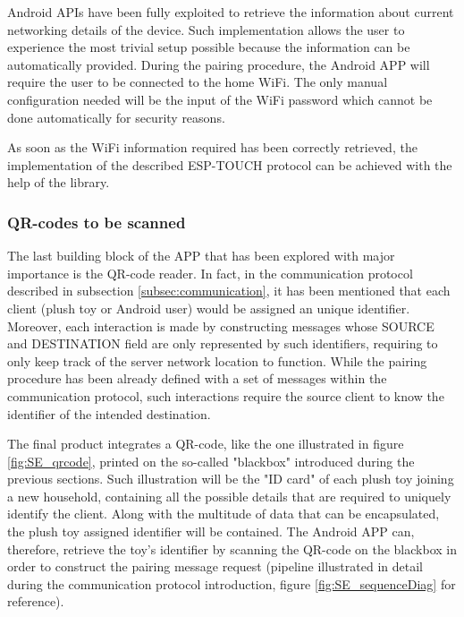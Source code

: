 Android APIs have been fully exploited to retrieve the information about current networking details of the device. Such implementation allows the user to experience the most trivial setup possible because the information can be automatically provided. During the pairing procedure, the Android APP will require the user to be connected to the home WiFi. The only manual configuration needed will be the input of the WiFi password which cannot be done automatically for security reasons.

\medskip
As soon as the WiFi information required has been correctly retrieved, the implementation of the described ESP-TOUCH protocol can be achieved with the help of the library.

\subsubsection{QR-codes to be scanned}
\label{subsubsec:android-barcode} 

The last building block of the APP that has been explored with major importance is the QR-code reader. In fact, in the communication protocol described in subsection \ref{subsec:communication}, it has been mentioned that each client (plush toy or Android user) would be assigned an unique identifier. Moreover, each interaction is made by constructing messages whose SOURCE and DESTINATION field are only represented by such identifiers, requiring to only keep track of the server network location to function. While the pairing procedure has been already defined with a set of messages within the communication protocol, such interactions require the source client to know the identifier of the intended destination.

\medskip
The final product integrates a QR-code, like the one illustrated in figure \ref{fig:SE_qrcode}, printed on the so-called "blackbox" introduced during the previous sections. Such illustration will be the "ID card" of each plush toy joining a new household, containing all the possible details that are required to uniquely identify the client. Along with the multitude of data that can be encapsulated, the plush toy assigned identifier will be contained. The Android APP can, therefore, retrieve the toy's identifier by scanning the QR-code on the blackbox in order to construct the pairing message request (pipeline illustrated in detail during the communication protocol introduction, figure \ref{fig:SE_sequenceDiag} for reference).

